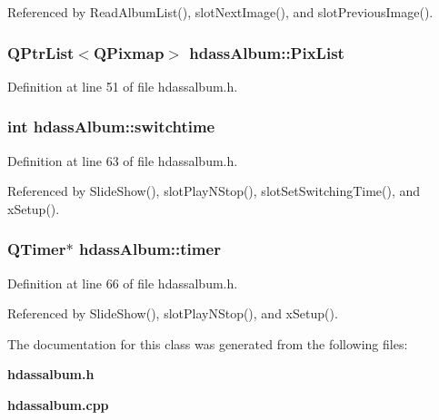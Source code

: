 Referenced by Read\-Album\-List(), slot\-Next\-Image(), and slot\-Previous\-Image().
\subsubsection{\setlength{\rightskip}{0pt plus 5cm}QPtr\-List$<$QPixmap$>$ {\bf hdass\-Album::Pix\-List}}\label{classhdassAlbum_ImageDetialo3}




Definition at line 51 of file hdassalbum.h.
\subsubsection{\setlength{\rightskip}{0pt plus 5cm}int {\bf hdass\-Album::switchtime}\hspace{0.3cm}{\tt  [private]}}\label{classhdassAlbum_hdassAlbumr0}




Definition at line 63 of file hdassalbum.h.

Referenced by Slide\-Show(), slot\-Play\-NStop(), slot\-Set\-Switching\-Time(), and x\-Setup().
\subsubsection{\setlength{\rightskip}{0pt plus 5cm}QTimer$\ast$ {\bf hdass\-Album::timer}\hspace{0.3cm}{\tt  [private]}}\label{classhdassAlbum_hdassAlbumr3}




Definition at line 66 of file hdassalbum.h.

Referenced by Slide\-Show(), slot\-Play\-NStop(), and x\-Setup().

The documentation for this class was generated from the following files:\begin{CompactItemize}
\item 
{\bf hdassalbum.h}\item 
{\bf hdassalbum.cpp}\end{CompactItemize}

